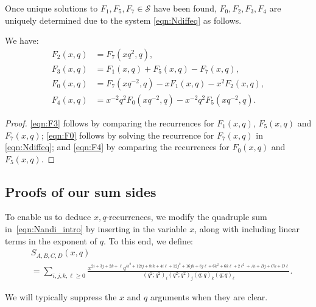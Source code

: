 \documentclass[ALCO,Unicode,published]{cedram}
\newcommand{\sS}{\mathscr{S}}
\begin{document}
Once unique solutions to $F_1, F_5, F_7 \in \sS$ have been found,
$F_0, F_2, F_3, F_4$ are uniquely determined due to the system \eqref{eqn:Ndiffeq} as follows.
\begin{prop} 
\label{prop:intermsof157}
We have:
\begin{align}
F_2(x,q)&=F_7(xq^2,q), \label{eqn:F2}\\
F_3(x,q)&=F_1(x,q) + F_5(x,q)-F_7(x,q),\label{eqn:F3}\\
F_0(x,q)&=F_7(xq^{-2},q)-xF_1(x,q)-x^2F_2(x,q),\label{eqn:F0}\\
F_4(x,q)&=x^{-2}q^{2}F_0(xq^{-2},q)-x^{-2}q^{2}F_5(xq^{-2},q).\label{eqn:F4}
\end{align}
\end{prop}
\begin{proof}
\eqref{eqn:F3} follows by comparing the recurrences for $F_1(x,q)$, $F_5(x,q)$ and $F_7(x,q)$;
\eqref{eqn:F0} follows by solving the recurrence for $F_7(x,q)$ in \eqref{eqn:Ndiffeq}; and
\eqref{eqn:F4} by comparing the recurrences for $F_0(x,q)$ and $F_5(x,q)$.
\end{proof}

\subsection{Proofs of our sum sides}
To enable us to deduce $x,q$-recurrences, we modify the quadruple sum in~\eqref{eqn:Nandi_intro} by inserting in the variable $x$, along with including linear terms in the exponent of $q$. To this end, we define:
\begin{align}
&S_{A,B,C,D}(x,q) \\
&= \sum_{i,j,k,\ell \ge 0}
\frac{x^{2i+3j+2k+\ell} q^{4i^2 + 12 ij + 8ik + 4i\ell + 12j^2 + 16jk + 8j\ell + 6k^2+6k\ell+2\ell^2+Ai+Bj+Ck+D\ell}}
{\left(q^2;q^2\right)_i\left(q^2;q^2\right)_j\left(q;q\right)_k\left(q;q\right)_\ell}.
\nonumber
\end{align}

We will typically suppress the $x$ and $q$ arguments when they are clear.
\end{document}
